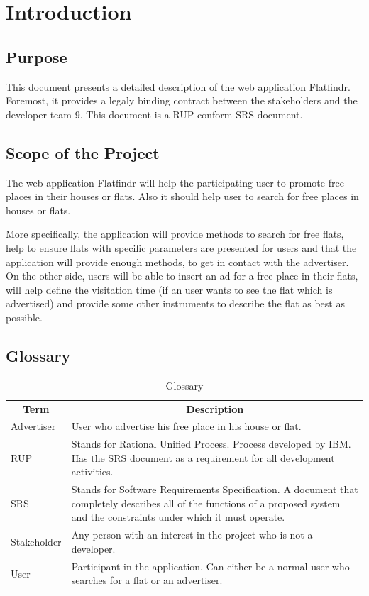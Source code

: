 \section{Introduction}

\subsection{Purpose}
This document presents a detailed description of the web application Flatfindr.
Foremost, it provides a legaly binding contract between the stakeholders and the
developer team 9. This document is a RUP conform SRS document.

\subsection{Scope of the Project}
The web application Flatfindr will help the participating user to promote free
places in their houses or flats. Also it should help user to search for free
places in houses or flats.

More specifically, the application will provide methods to search for free
flats, help to ensure flats with specific parameters are presented for users and
that the application will provide enough methods, to get in contact with the
advertiser. On the other side, users will be able to insert an ad for a free
place in their flats, will help define the visitation time (if an user wants to
see the flat which is advertised) and provide some other instruments to describe
the flat as best as possible.

\subsection{Glossary}

\begin{table}[H]
	\centering
	\begin{tabular}{p{3cm}p{9cm}}
	\multicolumn{1}{c}{\textbf{Term}} & \multicolumn{1}{c}{\textbf{Description}} \\
Advertiser & User who advertise his free place in his house or flat. \\
RUP & Stands for Rational Unified Process. Process developed by IBM. Has the SRS document as a requirement for all development activities. \\
SRS & Stands for Software Requirements Specification. A document that completely describes all of the functions of a proposed system and the constraints under which it must operate. \\
Stakeholder & Any person with an interest in the project who is not a developer. \\
User & Participant in the application. Can either be a normal user who searches for a flat or an advertiser. 
	\end{tabular}
	\caption{Glossary}
	\label{table-glossary}
\end{table}

